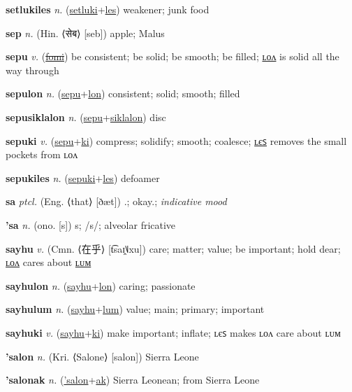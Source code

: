 \textbf{\hypertarget{setlukiles}{setlukiles}} \textit{n.} (\hyperlink{setluki}{setluki}+\allowbreak \hyperlink{les}{les})
weakener; junk food

\textbf{\hypertarget{sep}{sep}} \textit{n.} (Hin. ⟨{\devanagari{}सेब}⟩ [seb])
apple; Malus

\textbf{\hypertarget{sepu}{sepu}} \textit{v.} (\hyperlink{fomi}{\sout{fomi}})
be consistent; be solid; be smooth; be filled; \hyperlink{sepulon}{ʟᴏᴧ} is solid all the way through

\textbf{\hypertarget{sepulon}{sepulon}} \textit{n.} (\hyperlink{sepu}{sepu}+\allowbreak \hyperlink{lon}{lon})
consistent; solid; smooth; filled

\textbf{\hypertarget{sepusiklalon}{sepusiklalon}} \textit{n.} (\hyperlink{sepu}{sepu}+\allowbreak \hyperlink{siklalon}{siklalon})
disc

\textbf{\hypertarget{sepuki}{sepuki}} \textit{v.} (\hyperlink{sepu}{sepu}+\allowbreak \hyperlink{ki}{ki})
compress; solidify; smooth; coalesce; \hyperlink{sepukiles}{ʟєꜱ} removes the small pockets from ʟᴏᴧ

\textbf{\hypertarget{sepukiles}{sepukiles}} \textit{n.} (\hyperlink{sepuki}{sepuki}+\allowbreak \hyperlink{les}{les})
defoamer

\textbf{\hypertarget{sa}{sa}} \textit{ptcl.} (Eng. ⟨that⟩ [ðæt])
.; okay.; \textit{indicative mood}

\textbf{\hypertarget{'sa}{'sa}} \textit{n.} (ono. [s])
s; /s/; alveolar fricative

\textbf{\hypertarget{sayhu}{sayhu}} \textit{v.} (Cmn. ⟨{\chinese{}在乎}⟩ [t͡saɪ̯˥˩xu])
care; matter; value; be important; hold dear; \hyperlink{sayhulon}{ʟᴏᴧ} cares about \hyperlink{sayhulum}{ʟᴜᴍ}

\textbf{\hypertarget{sayhulon}{sayhulon}} \textit{n.} (\hyperlink{sayhu}{sayhu}+\allowbreak \hyperlink{lon}{lon})
caring; passionate

\textbf{\hypertarget{sayhulum}{sayhulum}} \textit{n.} (\hyperlink{sayhu}{sayhu}+\allowbreak \hyperlink{lum}{lum})
value; main; primary; important

\textbf{\hypertarget{sayhuki}{sayhuki}} \textit{v.} (\hyperlink{sayhu}{sayhu}+\allowbreak \hyperlink{ki}{ki})
make important; inflate; ʟєꜱ makes ʟᴏᴧ care about ʟᴜᴍ

\textbf{\hypertarget{'salon}{'salon}} \textit{n.} (Kri. ⟨Salone⟩ [salon])
Sierra Leone

\textbf{\hypertarget{'salonak}{'salonak}} \textit{n.} (\hyperlink{'salon}{'salon}+\allowbreak \hyperlink{ak}{ak})
Sierra Leonean; from Sierra Leone

